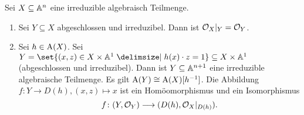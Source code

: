 \documentclass[12pt,a4paper]{scrartcl}
\theoremstyle{cplain}
\theoremstyle{cdef}
\begin{document}
\begin{lem}
	Sei $X\subseteq \mathbb A^n$ eine irreduzible algebraisch Teilmenge. 
	\begin{enumerate}
		\item Sei $Y\subseteq X$ abgeschlossen und irreduzibel. Dann ist $\mathcal{O}_X|_Y = \mathcal{O}_Y$. \label{lem:10.13:i}
		\item Sei $h\in \operatorname{A}(X)$. Sei $Y = \set {(x,z)\in X\times \IA^1\given h(x)\cdot z = 1}\subseteq X\times \IA^1$ (abgeschlossen und irreduzibel). Dann ist $Y\subseteq \mathbb A^{n+1}$ eine irreduzible algebraische Teilmenge. Es gilt $\operatorname{A}(Y) \cong \operatorname{A}(X)[h^{-1}]$. Die Abbildung $f\colon Y\to D(h), (x,z)\mapsto x$ ist ein Homöomorphismus und ein Isomorphismus \[f\colon (Y,\mathcal{O}_Y)\longrightarrow (D(h), \mathcal{O}_X|_{D(h)}).\] \label{lem:10.13:ii}
	\end{enumerate}
\end{lem}
\end{document}
